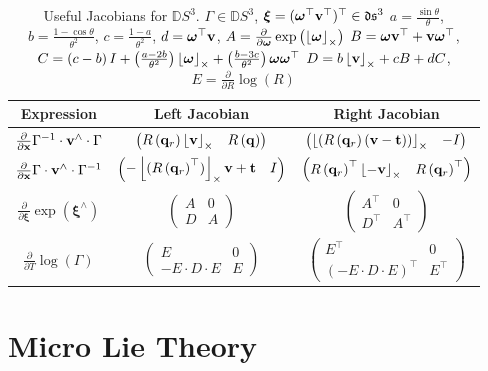 \begin{table}[ht]
\caption{Useful Jacobians for $\mathbb{D} S^{3}$. \newline
	$\Gamma\in\mathbb{D} S^{3}$, $\boldsymbol{\xi}=(\boldsymbol{\omega}^\top \mathbf{v}^\top)^{\top}\in\mathfrak{ds}^{3}$ \newline
	$a=\frac{\sin\theta}{\theta}$, $b=\frac{1-\cos\theta}{\theta^{2}}$, $c=\frac{1-a}{\theta^{2}}$, \newline 
	$d=\boldsymbol{\omega}^{\top}\mathbf{v}$,  $A=\frac{\partial}{\partial\boldsymbol{\omega}}\exp\left(\left\lfloor\boldsymbol{\omega}\right\rfloor_{\times}\right)$ \newline
	$B=\boldsymbol{\omega}\mathbf{v}^{\top}+\mathbf{v}\boldsymbol{\omega}^{\top}$, \newline
	$C=\left(c-b\right)I+\left(\frac{a-2b}{\theta^{2}}\right)\left\lfloor\boldsymbol{\omega}\right\rfloor_{\times}+\left(\frac{b-3c}{\theta^{2}}\right)\boldsymbol{\omega}\boldsymbol{\omega}^{\top}$ \newline
	$D=b\left\lfloor\mathbf{v}\right\rfloor_{\times}+cB+dC$, \newline
	$E=\frac{\partial}{\partial R}\log\left(R\right)$
    }
\label{tab:lie_identities_ds3}
\bgroup
\def\arraystretch{2.0}
\begin{tabular}{ccc}
	\toprule
		Expression & Left Jacobian & Right Jacobian\\
	\midrule 
	$\frac{\partial}{\partial\mathbf{x}}\Gamma^{-1}\cdot\mathbf{v}^{\wedge}\cdot\Gamma$ & $\begin{pmatrix}R\left(\mathbf{q}_{r}\right)\left\lfloor\mathbf{v}\right\rfloor_{\times} & R\left(\mathbf{q}\right)\end{pmatrix}$ & $\begin{pmatrix}\left\lfloor(R\left(\mathbf{q}_{r}\right)\left(\mathbf{v}-\mathbf{t}\right))\right\rfloor_{\times} & -I\end{pmatrix}$\tabularnewline[0.15cm]
	$\frac{\partial}{\partial\mathbf{x}}\Gamma\cdot\mathbf{v}^{\wedge}\cdot\Gamma^{-1}$ & $\begin{pmatrix}-\left\lfloor(R\left(\mathbf{q}_{r}\right)^{\top})\right\rfloor_{\times}\mathbf{v}+\mathbf{t} & I\end{pmatrix}$ & $\begin{pmatrix}R\left(\mathbf{q}_{r}\right)^{\top}\left\lfloor-\mathbf{v}\right\rfloor_{\times} & R\left(\mathbf{q}_{r}\right)^{\top}\end{pmatrix}$\tabularnewline[0.15cm]
	$\frac{\partial}{\partial\boldsymbol{\xi}}\exp\left(\boldsymbol{\xi^{\wedge}}\right)$ & $\begin{pmatrix}A & 0\\
	D & A
	\end{pmatrix}$ & $\begin{pmatrix}A^{\top} & 0\\
	D^{\top} & A^{\top}
	\end{pmatrix}$\tabularnewline[0.15cm]
	$\frac{\partial}{\partial T}\log\left(\Gamma\right)$ & $\begin{pmatrix}E & 0\\
	-E\cdot D\cdot E & E
	\end{pmatrix}$ & $\begin{pmatrix}E^{\top} & 0\\
	\left(-E\cdot D\cdot E\right)^{\top} & E^{\top}
	\end{pmatrix}$\tabularnewline[0.15cm]
	\bottomrule
\end{tabular}
\egroup
\end{table}

\clearpage


\section{Micro Lie Theory}




